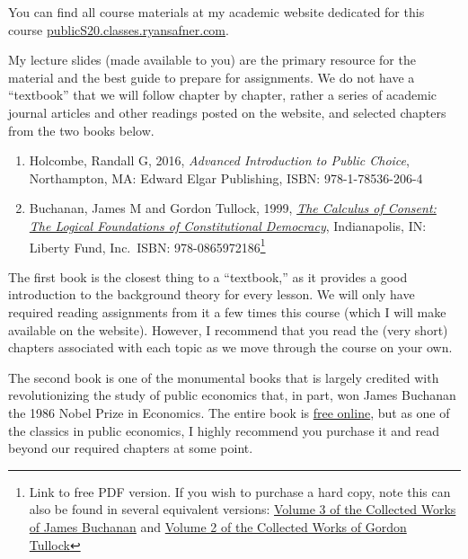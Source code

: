 \documentclass{article}
\providecommand{\tightlist}{%
  \setlength{\itemsep}{0pt}\setlength{\parskip}{0pt}}
\begin{document}
You can find all course materials at my academic website dedicated for
this course
\href{http://publics20.classes.ryansafner.com}{publicS20.classes.ryansafner.com}.

My lecture slides (made available to you) are the primary resource for
the material and the best guide to prepare for assignments. We do not
have a ``textbook'' that we will follow chapter by chapter, rather a
series of academic journal articles and other readings posted on the
website, and selected chapters from the two books below.

\begin{enumerate}
\def\labelenumi{\arabic{enumi}.}
\tightlist
\item
  Holcombe, Randall G, 2016, \emph{Advanced Introduction to Public
  Choice}, Northampton, MA: Edward Elgar Publishing, ISBN:
  978-1-78536-206-4
\item
  Buchanan, James M and Gordon Tullock, 1999,
  \href{https://oll.libertyfund.org/titles/buchanan-the-calculus-of-consent-logical-foundations-of-constitutional-democracy}{\emph{The
  Calculus of Consent: The Logical Foundations of Constitutional
  Democracy}}, Indianapolis, IN: Liberty Fund, Inc.~ISBN:
  978-0865972186\footnote{Link to free PDF version. If you wish to
    purchase a hard copy, note this can also be found in several
    equivalent versions:
    \href{https://www.amazon.com/Calculus-Consent-Collected-Works-Buchanan/dp/0865972184}{Volume
    3 of the Collected Works of James Buchanan} and
    \href{https://www.amazon.com/Calculus-Consent-Selected-Gordon-Tullock/dp/0865975329/ref=pd_sbs_14_t_0/146-3613138-3597117?_encoding=UTF8\&pd_rd_i=0865975329\&pd_rd_r=d4b5a96a-f9bc-4afb-8820-a2dd881d9079\&pd_rd_w=sf42p\&pd_rd_wg=R2xmd\&pf_rd_p=5cfcfe89-300f-47d2-b1ad-a4e27203a02a\&pf_rd_r=H3W75RS4ZR4KCQH6H2G1\&psc=1\&refRID=H3W75RS4ZR4KCQH6H2G1}{Volume
    2 of the Collected Works of Gordon Tullock} }
\end{enumerate}

The first book is the closest thing to a ``textbook,'' as it provides a
good introduction to the background theory for every lesson. We will
only have required reading assignments from it a few times this course
(which I will make available on the website). However, I recommend that
you read the (very short) chapters associated with each topic as we move
through the course on your own.

The second book is one of the monumental books that is largely credited
with revolutionizing the study of public economics that, in part, won
James Buchanan the 1986 Nobel Prize in Economics. The entire book is
\href{https://oll.libertyfund.org/titles/buchanan-the-calculus-of-consent-logical-foundations-of-constitutional-democracy}{free
online}, but as one of the classics in public economics, I highly
recommend you purchase it and read beyond our required chapters at some
point.
\end{document}

